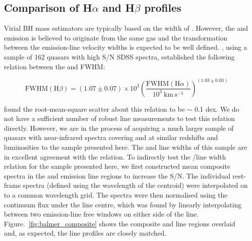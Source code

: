 \subsection{Comparison of H$\alpha$ and H$\beta$ profiles}

Virial BH mass estimators are typically based on the width of \hbns. 
However, the \ha and \hb emission is believed to originate from the same gas and the transformation between the emission-line velocity widths is expected to be well defined. 
\citet{greene05}, using a sample of 162 quasars with high S/N SDSS spectra, established the following relation between the \ha and \hb FWHM:

\begin{equation}
  \label{eq:hb2hawidth}
  \text{FWHM}(\text{H}\beta) = (1.07 \pm 0.07) \times 10^3 \left( \frac{ \text{FWHM}(\text{H}\alpha) }{10^3 ~\text{km}~\text{s}^{-1} } \right)^{(1.03 \pm 0.03)}
\end{equation}

\citet{greene05} found the root-mean-square scatter about this relation to be $\sim$ 0.1 dex. 
We do not have a sufficient number of robust \hb line measurements to test this relation directly.
However, we are in the process of acquiring a much larger sample of quasars with near-infrared spectra covering \ha and \hb at similar redshifts and luminosities to the sample presented here. 
The \ha and \hb line widths of this sample are in excellent agreement with the \citet{greene05} relation. 
To indirectly test the \hans/\hb line width relation for the sample presented here, we first constructed mean composite spectra in the \ha and \hb emission line regions to increase the S/N. 
The individual rest-frame spectra (defined using the wavelength of the \ha centroid) were interpolated on to a common wavelength grid. 
The spectra were then normalised using the continuum flux under the line centre, which was found by linearly interpolating between two emission-line free windows on either side of the line. 
Figure.~\ref{fig:balmer_composite} shows the composite \ha and \hb line regions overlaid and, as expected, the line profiles are closely matched.

